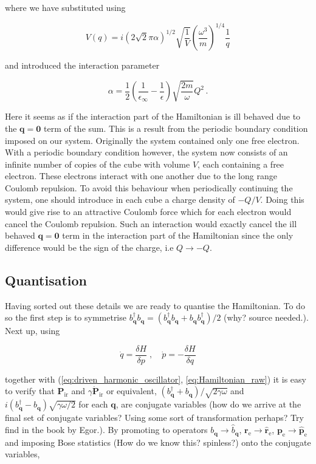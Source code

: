 \documentclass[12pt]{report}
\renewcommand{\vec}[1]{\boldsymbol{\mathbf{#1}}}                        %
\newcommand{\question}[1]{{\leavevmode\color{question}#1}}
\begin{document}
where we have substituted using

\begin{equation}
	V(q) = i \left( 2 \sqrt 2 \pi \alpha \right)^{1/2} \sqrt{ \frac{1}{V} } \left( \frac{\omega^3}{m} \right)^{1/4} \frac{1}{q}
\end{equation}

and introduced the interaction parameter

\begin{equation}
	\alpha = \frac{1}{2} \left( \frac{1}{\epsilon_\infty} - \frac{1}{\epsilon} \right) \sqrt{ \frac{2m}{\omega} } Q^2 \,.
\end{equation}

Here it seems as if the interaction part of the Hamiltonian is ill behaved due to the $ \vec q = \vec 0 $ term of the sum. This is a result from the periodic boundary condition imposed on our system. Originally the system contained only one free electron. With a periodic boundary condition however, the system now consists of an infinite number of copies of the cube with volume $ V $, each containing a free electron. These electrons interact with one another due to the long range Coulomb repulsion. To avoid this behaviour when periodically continuing the system, one should introduce in each cube a charge density of $ - Q/V $. Doing this would give rise to an attractive Coulomb force which for each electron would cancel the Coulomb repulsion. Such an interaction would exactly cancel the ill behaved $ \vec q = \vec 0 $ term in the interaction part of the Hamiltonian since the only difference would be the sign of the charge, i.e $ Q \rightarrow -Q $.

\subsection{Quantisation}

Having sorted out these details we are ready to quantise the Hamiltonian. To do so the first step is to symmetrise $ b^\dagger_{\vec q} b_{\vec q} = (b^\dagger_{\vec q} b_{\vec q} + b_{\vec q} b^\dagger_{\vec q})/2 $ \question{(why? source needed.)}. Next up, using\cite{superfluidStatesOfMatter}

\begin{equation}
	\dot q = \frac{\delta H}{\delta p}
	\; , \quad
	\dot p = - \frac{\delta H}{\delta q}
\end{equation}

together with (\ref{eq:driven_harmonic_oscillator}, \ref{eq:Hamiltonian_raw}) it is easy to verify that $ \vec P_\text{ir} $ and $ \gamma \dot{ \vec P}_\text{ir} $ or equivalent, $ (b^\dagger_{\vec q} + b_{\vec q})/\sqrt{2 \gamma \omega} $ and $ i (b^\dagger_{\vec q} - b_{\vec q}) \sqrt{\gamma \omega / 2} $ for each $ \vec q $, are conjugate variables \question{(how do we arrive at the final set of conjugate variables? Using some sort of transformation perhaps? Try find in the book by Egor.)}.  By promoting to operators $ b_{\vec q} \rightarrow \hat b_{\vec q} $, $ \vec r_\text{e} \rightarrow \hat{\vec r}_\text{e} $, $ \vec p_\text{e} \rightarrow \hat{\vec p}_\text{e} $ and imposing Bose statistics \question{(How do we know this? spinless?)} onto the conjugate variables,
\end{document}
